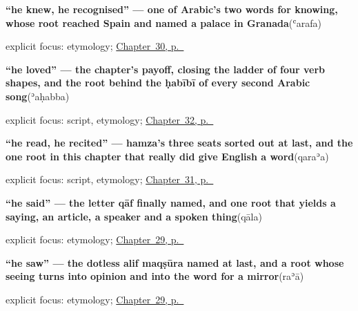 \noindent\begin{minipage}[t]{\linewidth}
\raggedright
\textbf{\textquotedblleft{}he knew, he recognised\textquotedblright{} — one of Arabic's two words for knowing, whose root reached Spain and named a palace in Granada}\enspace\emph{}\enspace(ʿarafa)\par
\footnotesize explicit focus: etymology; \hyperref[ch:ar-knowing-and-eating]{Chapter~30, p.~\pageref*{ch:ar-knowing-and-eating}}
\end{minipage}\par\smallskip

\noindent\begin{minipage}[t]{\linewidth}
\raggedright
\textbf{\textquotedblleft{}he loved\textquotedblright{} — the chapter's payoff, closing the ladder of four verb shapes, and the root behind the ḥabībī of every second Arabic song}\enspace\emph{}\enspace(ʾaḥabba)\par
\footnotesize explicit focus: script, etymology; \hyperref[ch:ar-taking-thinking-helping-loving]{Chapter~32, p.~\pageref*{ch:ar-taking-thinking-helping-loving}}
\end{minipage}\par\smallskip

\noindent\begin{minipage}[t]{\linewidth}
\raggedright
\textbf{\textquotedblleft{}he read, he recited\textquotedblright{} — hamza's three seats sorted out at last, and the one root in this chapter that really did give English a word}\enspace\emph{}\enspace(qaraʾa)\par
\footnotesize explicit focus: script, etymology; \hyperref[ch:ar-understanding-reading-writing]{Chapter~31, p.~\pageref*{ch:ar-understanding-reading-writing}}
\end{minipage}\par\smallskip

\noindent\begin{minipage}[t]{\linewidth}
\raggedright
\textbf{\textquotedblleft{}he said\textquotedblright{} — the letter qāf finally named, and one root that yields a saying, an article, a speaker and a spoken thing}\enspace\emph{}\enspace(qāla)\par
\footnotesize explicit focus: etymology; \hyperref[ch:ar-saying-and-seeing]{Chapter~29, p.~\pageref*{ch:ar-saying-and-seeing}}
\end{minipage}\par\smallskip

\noindent\begin{minipage}[t]{\linewidth}
\raggedright
\textbf{\textquotedblleft{}he saw\textquotedblright{} — the dotless alif maqṣūra named at last, and a root whose seeing turns into opinion and into the word for a mirror}\enspace\emph{}\enspace(raʾā)\par
\footnotesize explicit focus: etymology; \hyperref[ch:ar-saying-and-seeing]{Chapter~29, p.~\pageref*{ch:ar-saying-and-seeing}}
\end{minipage}\par\smallskip

